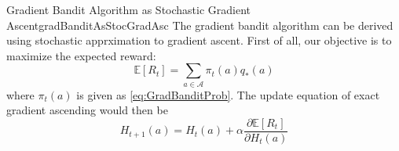 \documentclass[../../main.tex]{subfiles}
\begin{document}
            \begin{rem}{Gradient Bandit Algorithm as Stochastic Gradient Ascent}{gradBanditAsStocGradAsc}
                The gradient bandit algorithm can be derived using stochastic apprximation to gradient ascent.
                First of all, our objective is to maximize the expected reward:
                \begin{equation}
                    \mathbb{E}[R_t]=\sum_{a \in \mathcal{A}} \pi_t(a)q_*(a)
                \end{equation}
                where $\pi_t(a)$ is given as \ref{eq:GradBanditProb}.
                The update equation of exact gradient ascending would then be
                \begin{equation}
                    H_{t+1}(a)=H_t(a)+\alpha\frac{\partial\mathbb{E}[R_t]}{\partial H_t(a)} \label{eq:gradUpdate}
                \end{equation}


\end{rem}
\end{document}
